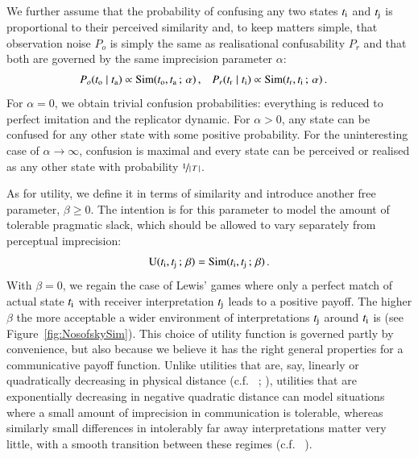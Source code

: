 \documentclass[11pt,english]{article}
\newcommand{\imprecision}{\ensuremath{\alpha}} %
\newcommand{\toler}{\ensuremath{\beta}} %
\newcommand{\similarity}{\ensuremath{\mathrm{Sim}}} %
\numberwithin{equation}{section}
\newcommand{\citealtbjps}[1]{\citeauthor{#1} \citeyear{#1}}
\newcommand{\citepbjpspre}[2]{(#1~\citeauthor{#2} \citeyear{#2})}
\begin{document}
We further assume that the probability of confusing any two states $t_{\mathrm{i}}$ and
$t_{\mathrm{j}}$ is proportional to their perceived similarity and, to keep matters simple, that
observation noise $P_o$ is simply the same as realisational confusability $P_r$ and
that both are governed by the same imprecision parameter $\alpha$:
\begin{align*}
  P_o(\mystate{o} \probbar \mystate{a}) & \propto \similarity(\mystate{o}, \mystate{a} \myts ; \myts
  \imprecision)\,, &   P_r(\mystate{r} \probbar \mystate{i}) & \propto \similarity(\mystate{r}, \mystate{i} \myts ; \myts
  \imprecision) \,.
\end{align*}
For $\imprecision = 0$, we obtain trivial confusion probabilities: everything is reduced to
perfect imitation and the replicator dynamic. For $\imprecision > 0$, any state can be confused
for any other state with some positive probability. For the uninteresting case of
$\imprecision \rightarrow \infty$, confusion is maximal and every state can be perceived or
realised as any other state with probability $\nicefrac{1}{\left \lvert \, T \, \right\rvert}$.

As for utility, we define it in terms of similarity and introduce another free parameter,
$\toler \ge 0$.  The intention is for this parameter to model the amount of tolerable pragmatic
slack, which should be allowed to vary separately from perceptual imprecision:
\begin{align*}
  \util(\mystate{i}, \mystate{j} \myts ; \myts \toler) =
      \similarity(\mystate{i}, \mystate{j} \myts ; \myts \toler)\,.
\end{align*}
With $\toler = 0$, we regain the case of Lewis' games where only a perfect match of actual
state $t_{\mathrm{i}}$ with receiver interpretation $t_{\mathrm{j}}$ leads to a positive payoff. The
higher $\toler$ the more acceptable a wider environment of interpretations $t_{\mathrm{j}}$ around
$t_{\mathrm{i}}$ is (see Figure~\ref{fig:NosofskySim}).  This choice of utility function is
governed partly by convenience, but also because we believe it has the right general properties
for a communicative payoff function.  Unlike utilities that are, say, linearly or quadratically
decreasing in physical distance (c.f.~\citealtbjps{JagerMetzger2011:Voronoi-Languag};
\citealtbjps{FrankeJager2010:Vagueness-Signa}), utilities that are exponentially decreasing in
negative quadratic distance can model situations where a small amount of imprecision in
communication is tolerable, whereas similarly small differences in intolerably far away
interpretations matter very little, with a smooth transition between these regimes
\citepbjpspre{c.f.}{OConnor2013:The-Evolution-o}.
\end{document}
